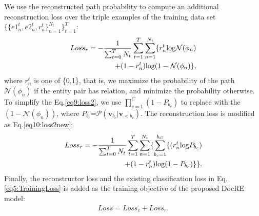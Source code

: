 \documentclass[letterpaper]{article} \usepackage{aaai21}  \usepackage{times}  \usepackage{helvet} \usepackage{courier}  \usepackage[hyphens]{url}  \usepackage{graphicx} \urlstyle{rm} \def\UrlFont{\rm}  \usepackage{natbib}  \usepackage{caption} \frenchspacing  \setlength{\pdfpagewidth}{8.5in}  \setlength{\pdfpageheight}{11in}  \usepackage{amsmath}
\begin{document}
We use the reconstructed path probability to compute an additional reconstruction loss over the triple examples of the training data set $\{\{e1^t_n, e2^t_n, r^t_{n}\}^{N_t}_{n=1}\}^T_{t=1}$:
\begin{equation}
\begin{split}
Loss_r=-\frac{1}{\sum_{t=0}^TN_t}\sum_{t=1}^T\sum_{n=1}^{N_t}\{r^t_n\textup{log}\mathcal{N}(\phi_n)\\
+(1-r^t_n)\textup{log}(1-\mathcal{N}(\phi_n)\},
\label{eq9:loss2}
\end{split}
\end{equation}
where $r^t_n$ is one of \{0,1\}, that is, we maximize the probability of the path $\mathcal{N}(\phi_n)$ if the entity pair has relation, and minimize the probability otherwise.
To simplify the Eq.\eqref{eq9:loss2}, we use $\prod_{c=1}^{C}(1-P_{b_c})$ to replace with the $(1-\mathcal{N}(\phi_n))$, where $P_{b_c}$=$\mathcal{P}(\textbf{v}_{b_c}|\textbf{v}_{<b_c})$. 
The reconstruction loss is modified as Eq.\eqref{eq10:loss2new}:
\begin{equation}
\begin{split}
Loss_r=-\frac{1}{\sum_{t=0}^TN_t}\sum_{t=1}^T\sum_{n=1}^{N_t}\{\sum_{b_c=1}^{b_C}\{(r^t_n\textup{log}P_{b_c})\\
+(1-r^t_n)\textup{log}(1-P_{b_c})\}\}.
\label{eq10:loss2new}
\end{split}
\end{equation}
Finally, the reconstructor loss and the existing classification loss in Eq.\eqref{eq5:TrainingLoss} is added as the training objective of the proposed DocRE model:
\begin{equation}
\begin{aligned}
Loss=Loss_c+Loss_r.
\label{eq11:LossFunction}
\end{aligned}
\end{equation}
\end{document}
